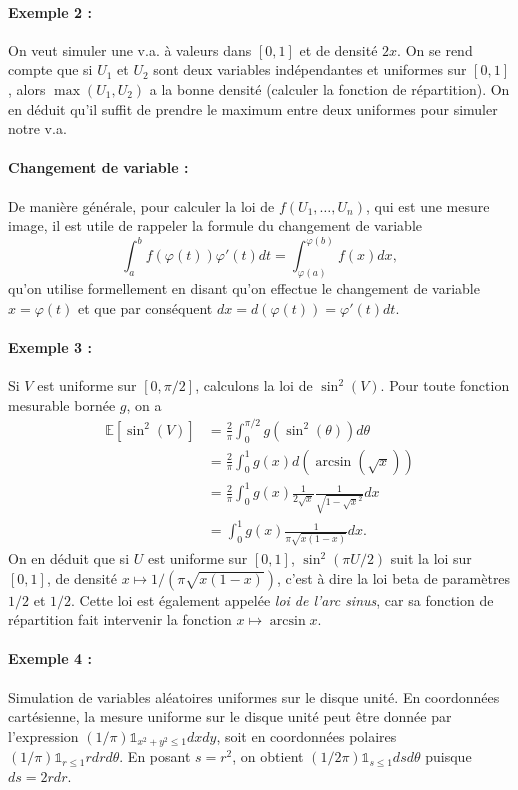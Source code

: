 \documentclass[a4paper,12pt]{book}
\begin{document}
\paragraph{Exemple 2 :}On veut simuler une v.a. à valeurs dans $[0,1]$ et de densité $2x$. On se rend compte que si $U_1$ et $U_2$ sont deux variables indépendantes et uniformes sur $[0,1]$, alors $\max(U_1,U_2)$ a la bonne densité (calculer la fonction de répartition). On en déduit qu'il suffit de prendre le maximum entre deux uniformes pour simuler notre v.a.
\paragraph{Changement de variable : }
De manière générale, pour calculer la loi de $f(U_1,\ldots,U_n)$, qui est une mesure image, il est utile de rappeler la formule du changement de variable
$$\int_a^b f(\varphi(t))\varphi'(t)dt=\int_{\varphi(a)}^{\varphi(b)} f(x)dx,$$
qu'on utilise formellement en disant qu'on effectue le changement de variable $x=\varphi(t)$ et que par conséquent $dx=d(\varphi(t))=\varphi'(t)dt$.


\paragraph{Exemple 3 :} Si $V$ est uniforme sur $[0, \pi/2]$, calculons la loi de $\sin^2(V)$. Pour toute fonction mesurable bornée $g$, on a
\begin{align*}
\mathbb{E}[\sin^2(V)]&= \frac{2}{\pi}\int_0^{\pi/2}g(\sin^2(\theta))d \theta\\
&=\frac{2}{\pi}\int_0^1g(x)d\left(\arcsin(\sqrt{x})\right)\\
&=\frac{2}{\pi}\int_0^1g(x)\frac{1}{2\sqrt{x}}\frac{1}{\sqrt{1-\sqrt{x}^2}}dx\\
&=\int_0^1g(x)\frac{1}{\pi \sqrt{x(1-x)}}dx.
\end{align*}
On en d\'eduit que si $U$ est uniforme sur $[0, 1]$, $\sin^2(\pi U/2)$ suit la loi sur $[0,1]$, de densit\'e $x \mapsto 1/(\pi \sqrt{x(1-x)})$, c'est \`a dire la loi beta de param\`etres $1/2$ et $1/2$. Cette loi est \'egalement appel\'ee {\it loi de l'arc sinus}, car sa fonction de r\'epartition fait intervenir la fonction $x \mapsto \arcsin x$.


\paragraph{Exemple 4 :} Simulation de variables aléatoires uniformes sur le disque unité. En coordonn\'ees cart\'esienne, la mesure uniforme sur le disque unit\'e peut \^etre donn\'ee par l'expression $(1/\pi) \mathds{1}_{x^2 + y^2 \leq 1} dx dy$, soit en
coordonn\'ees polaires $(1/\pi) \mathds{1}_{r \leq 1} r dr d\theta$. En posant $s = r^2$, on obtient
$(1/2\pi)  \mathds{1}_{s \leq 1} ds d\theta$ puisque $ds = 2 r dr$.
\end{document}
